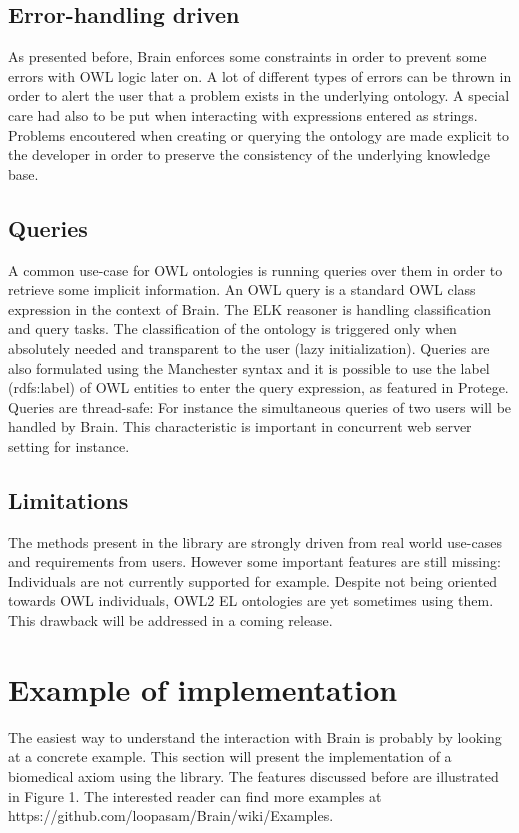 \documentclass{llncs}
\begin{document}
\subsection{Error-handling driven}
As presented before, Brain enforces some constraints in order to prevent some errors with OWL logic later on. 
A lot of different types of errors
can be thrown in order to alert the user that a problem exists in the underlying ontology. 
A special care had also to be put when interacting with expressions entered as strings. Problems encoutered when creating or querying
the ontology are made explicit to the developer in order to preserve the consistency of the underlying knowledge base.

\subsection{Queries}
A common use-case for OWL ontologies is running queries over them in order to retrieve some implicit information. An OWL query is a
standard OWL class expression in the context of Brain. The ELK reasoner is handling classification and query tasks. The classification
of the ontology is triggered only when absolutely needed and transparent to the user (lazy initialization). Queries are also formulated
using the Manchester syntax and it is possible to use the label (rdfs:label) of OWL entities to enter the query expression, as featured
in Protege. Queries are thread-safe: For instance the simultaneous queries of two users will be handled by Brain.
This characteristic is important in concurrent web server setting for instance.

\subsection{Limitations}
The methods present in the library are strongly driven from real world use-cases and requirements from users. However some important 
features are still missing: Individuals are not currently supported for example. Despite not being oriented towards OWL individuals, OWL2 EL
ontologies are yet sometimes using them. This drawback will be addressed in a coming release.

\section{Example of implementation}

The easiest way to understand the interaction with Brain is probably by looking at a concrete example. 
This section will present the implementation
of a biomedical axiom using the library. The features discussed before are illustrated in Figure 1.
The interested reader can find more examples at https://github.com/loopasam/Brain/wiki/Examples.
\end{document}
